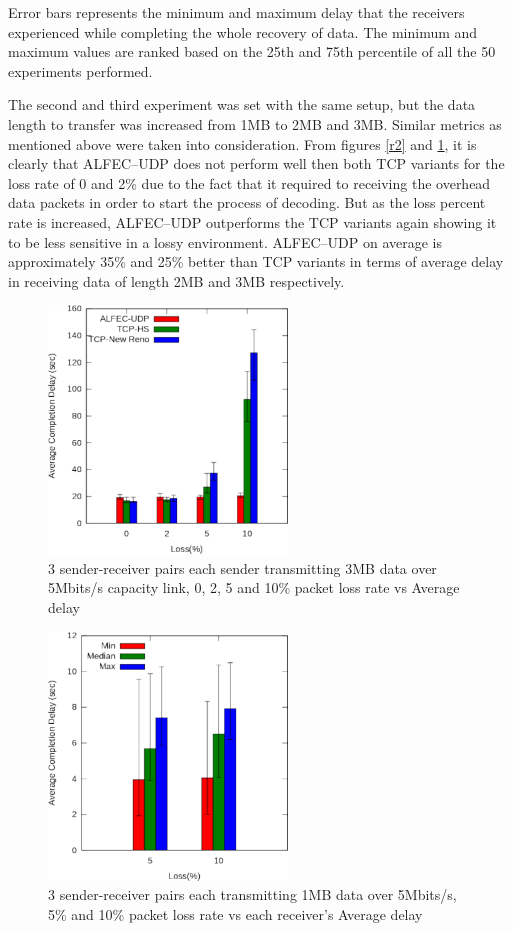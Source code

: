Error bars represents the minimum and maximum delay that the receivers experienced while completing the whole recovery of data. The minimum and maximum values are ranked based on the 25th and 75th percentile of all the 50 experiments performed.

The second and third experiment was set with the same setup, but the data length to transfer was increased from 1MB to 2MB and 3MB. Similar metrics as mentioned above were taken into consideration. From figures \ref{r2} and \ref{r3}, it is clearly that ALFEC--UDP does not perform well then both TCP variants for the loss rate of 0 and 2\% due to the fact that it required to receiving the overhead data packets in order to start the process of decoding. But as the loss percent rate is increased, ALFEC--UDP outperforms the TCP variants again showing it to be less sensitive in a lossy environment. ALFEC--UDP on average is approximately 35\% and 25\%  better than TCP variants in terms of average delay in receiving data of length 2MB and 3MB respectively.
\begin{figure}[htbp]
\begin{center}
\includegraphics[width=2.5in]{Figures/res3}
\caption{3 sender-receiver pairs each sender transmitting 3MB data over 5Mbits/s capacity link, 0, 2, 5 and 10\% packet loss rate vs Average delay}
\label{r3}
\end{center}
\end{figure}

\begin{figure}[htbp]
\begin{center}
\includegraphics[width=2.5in]{Figures/user1mb}
\caption{3 sender-receiver pairs each transmitting 1MB data over 5Mbits/s, 5\% and 10\% packet loss rate vs each receiver's Average delay}
\label{user1}
\end{center}
\end{figure}

